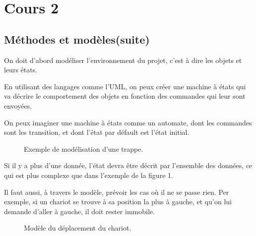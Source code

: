 \section{Cours 2}
\subsection{Méthodes et modèles(suite)}

On doit d'abord modéliser l'environnement du projet, c'est à dire les objets et leurs états.

En utilisant des langages comme l'UML, on peux créer une machine à états qui va décrire le comportement
des objets en fonction des commandes qui leur sont envoyées.

On peux imaginer une machine à états comme un automate, dont les commandes sont les transition,
et dont l'état par défault est l'état initial.\\
\begin{figure}[ht]
	\centering
	\caption{Exemple de modélisation d'une trappe.}
\end{figure}

Si il y a plus d'une donnée, l'état devra être décrit par l'ensemble des données, ce qui est plus complexe
que dans l'exemple de la figure 1.

Il faut aussi, à travers le modèle, prévoir les cas où il ne se passe rien. Per exemple, si un chariot se trouve à
sa position la plus à gauche, et qu'on lui demande d'aller à gauche, il doit rester immobile.
\begin{figure}[ht]
	\centering
	\caption{Modèle du déplacement du chariot.}
\end{figure}

